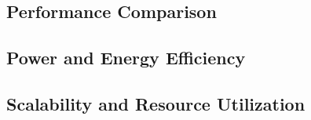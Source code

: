 
\subsection{Performance Comparison}
\subsection{Power and Energy Efficiency}
\subsection{Scalability and Resource Utilization}
